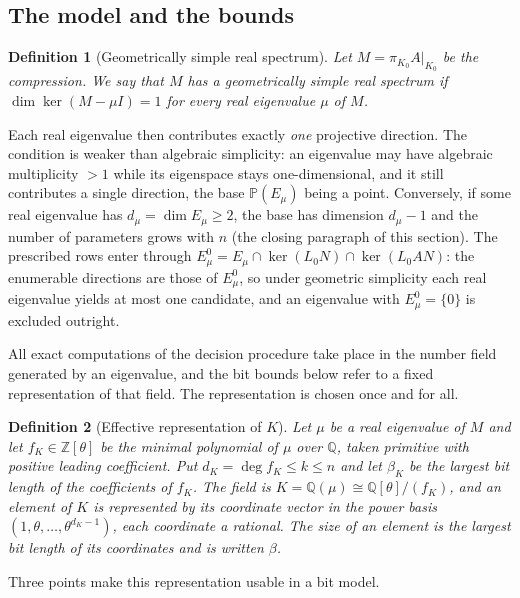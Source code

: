 \documentclass[journal]{IEEEtran}
\theoremstyle{plainn}
\newtheorem{defn}{Definition}
\theoremstyle{remark}
\begin{document}
\subsection{The model and the bounds}\label{sec5:sub:gsimple}

\begin{defn}[Geometrically simple real spectrum]\label{sec5:def:gsimple}
Let $M=\pi_{K_0}A|_{K_0}$ be the compression. We say that $M$ has a \emph{geometrically simple real
spectrum} if $\dim\ker(M-\mu I)=1$ for every real eigenvalue $\mu$ of $M$.
\end{defn}

Each real eigenvalue then contributes exactly \emph{one} projective direction. The condition is weaker
than algebraic simplicity: an eigenvalue may have algebraic multiplicity $>1$ while its eigenspace
stays one-dimensional, and it still contributes a single direction, the base
$\mathbb{P}(E_\mu)$ being a point. Conversely, if some real eigenvalue has
$d_\mu=\dim E_\mu\ge2$, the base has dimension $d_\mu-1$ and the number of parameters grows with $n$
(the closing paragraph of this section). The prescribed rows enter through
$E_\mu^0=E_\mu\cap\ker(L_0N)\cap\ker(L_0AN)$: the enumerable directions are those of $E_\mu^0$, so
under geometric simplicity each real eigenvalue yields at most one candidate, and an eigenvalue with
$E_\mu^0=\{0\}$ is excluded outright.

All exact computations of the decision procedure take place in the number field generated by an
eigenvalue, and the bit bounds below refer to a fixed representation of that field. The representation
is chosen once and for all.

\begin{defn}[Effective representation of $K$]\label{sec5:def:model}
Let $\mu$ be a real eigenvalue of $M$ and let $f_K\in\mathbb{Z}[\theta]$ be the minimal polynomial of
$\mu$ over $\mathbb{Q}$, taken primitive with positive leading coefficient. Put
$d_K=\deg f_K\le k\le n$ and let $\beta_K$ be the largest bit length of the coefficients of $f_K$. The
field is $K=\mathbb{Q}(\mu)\cong\mathbb{Q}[\theta]/(f_K)$, and an element of $K$ is represented by its
coordinate vector in the power basis $(1,\theta,\dots,\theta^{d_K-1})$, each coordinate a rational.
The \emph{size} of an element is the largest bit length of its coordinates and is written $\beta$.
\end{defn}

Three points make this representation usable in a bit model.
\end{document}
